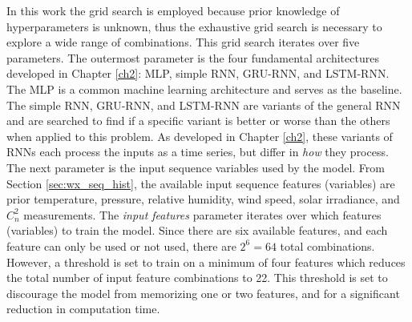 In this work the grid search is employed because prior knowledge of hyperparameters is unknown, thus the exhaustive grid search is necessary to explore a wide range of combinations. This grid search iterates over five parameters. The outermost parameter is the four fundamental architectures developed in Chapter \ref{ch2}: \ac{MLP}, simple \ac{RNN}, \ac{GRU-RNN}, and \ac{LSTM-RNN}. The \ac{MLP} is a common machine learning architecture and serves as the baseline. The simple \ac{RNN}, \ac{GRU-RNN}, and \ac{LSTM-RNN} are variants of the general \ac{RNN} and are searched to find if a specific variant is better or worse than the others when applied to this problem. As developed in Chapter \ref{ch2}, these variants of \ac{RNN}s each process the inputs as a time series, but differ in \emph{how} they process. The next parameter is the input sequence variables used by the model. From Section \ref{sec:wx_seq_hist}, the available input sequence features (variables) are prior temperature, pressure, relative humidity, wind speed, solar irradiance, and $C_{n}^{2}$ measurements. The \textit{input features} parameter iterates over which features (variables) to train the model. Since there are six available features, and each feature can only be used or not used, there are $2^6 = 64$ total combinations. However, a threshold is set to train on a minimum of four features which reduces the total number of input feature combinations to 22. This threshold is set to discourage the model from memorizing one or two features, and for a significant reduction in computation time.

